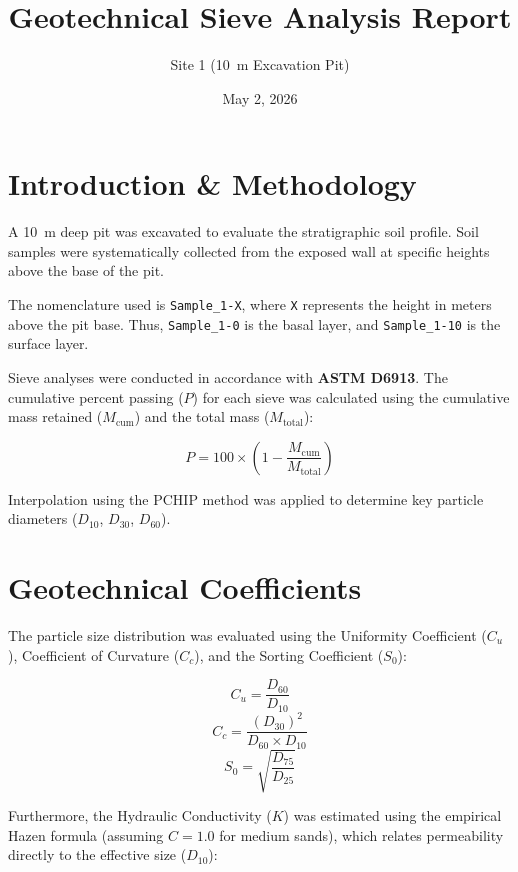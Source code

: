\documentclass[12pt,twoside,a4paper]{article}
\title{Geotechnical Sieve Analysis Report}
\author{Site 1 (\SI{10}{\metre} Excavation Pit)}
\date{May 2, 2026}
\begin{document}
	\maketitle
	
	\section{Introduction \& Methodology}
	A \SI{10}{\metre} deep pit was excavated to evaluate the stratigraphic soil profile. Soil samples were systematically collected from the exposed wall at specific heights above the base of the pit. 
	
	The nomenclature used is \texttt{Sample\_1-X}, where \texttt{X} represents the height in meters above the pit base. Thus, \texttt{Sample\_1-0} is the basal layer, and \texttt{Sample\_1-10} is the surface layer.
	
	Sieve analyses were conducted in accordance with \textbf{ASTM D6913}. The cumulative percent passing ($P$) for each sieve was calculated using the cumulative mass retained ($M_{\text{cum}}$) and the total mass ($M_{\text{total}}$):
	
	\begin{equation}
		P = 100 \times \left( 1 - \frac{M_{\text{cum}}}{M_{\text{total}}} \right)
	\end{equation}
	
	Interpolation using the PCHIP method was applied to determine key particle diameters ($D_{10}$, $D_{30}$, $D_{60}$).
	
	\section{Geotechnical Coefficients}
	The particle size distribution was evaluated using the Uniformity Coefficient ($C_u$), Coefficient of Curvature ($C_c$), and the Sorting Coefficient ($S_0$):
	
	\begin{equation}
		C_u = \frac{D_{60}}{D_{10}}
	\end{equation}
	\begin{equation}
		C_c = \frac{(D_{30})^2}{D_{60} \times D_{10}}
	\end{equation}
	\begin{equation}
		S_0 = \sqrt{\frac{D_{75}}{D_{25}}}
	\end{equation}
	
	Furthermore, the Hydraulic Conductivity ($K$) was estimated using the empirical Hazen formula (assuming $C=1.0$ for medium sands), which relates permeability directly to the effective size ($D_{10}$):
	
\end{document}
